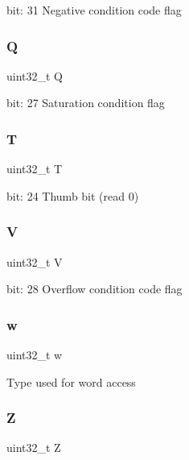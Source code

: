 bit\+: 31 Negative condition code flag \mbox{\label{unionx_p_s_r___type_a65f27ddc4f7e09c14ce7c5211b2e000a}} 
\subsubsection{\texorpdfstring{Q}{Q}}
{\footnotesize\ttfamily uint32\+\_\+t Q}

bit\+: 27 Saturation condition flag \mbox{\label{unionx_p_s_r___type_a6e1cf12e53a20224f6f62c001d9be972}} 
\subsubsection{\texorpdfstring{T}{T}}
{\footnotesize\ttfamily uint32\+\_\+t T}

bit\+: 24 Thumb bit (read 0) \mbox{\label{unionx_p_s_r___type_acd4a2b64faee91e4a9eef300667fa222}} 
\subsubsection{\texorpdfstring{V}{V}}
{\footnotesize\ttfamily uint32\+\_\+t V}

bit\+: 28 Overflow condition code flag \mbox{\label{unionx_p_s_r___type_ad0fb62e7a08e70fc5e0a76b67809f84b}} 
\subsubsection{\texorpdfstring{w}{w}}
{\footnotesize\ttfamily uint32\+\_\+t w}

Type used for word access \mbox{\label{unionx_p_s_r___type_a5ae954cbd9986cd64625d7fa00943c8e}} 
\subsubsection{\texorpdfstring{Z}{Z}}
{\footnotesize\ttfamily uint32\+\_\+t Z}

